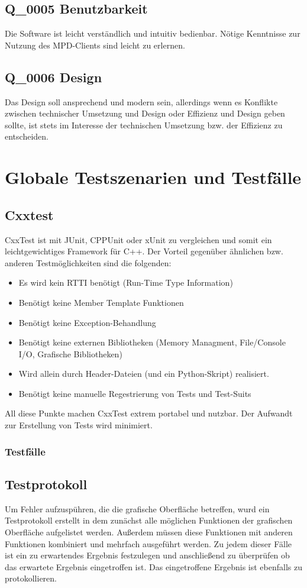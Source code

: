 \subsection{Q\_0005 Benutzbarkeit}
Die Software ist leicht verständlich und intuitiv bedienbar. Nötige Kenntnisse zur Nutzung des 
MPD-Clients sind leicht zu erlernen.
\subsection{Q\_0006 Design}
Das Design soll ansprechend und modern sein, allerdings wenn es Konflikte zwischen technischer Umsetzung 
und Design oder Effizienz und Design geben sollte, ist stets im Interesse der technischen Umsetzung bzw. 
der Effizienz zu entscheiden.
\section{Globale Testszenarien und Testfälle}
\subsection{Cxxtest}
CxxTest ist mit JUnit, CPPUnit oder xUnit zu vergleichen und somit ein leichtgewichtiges Framework für C++.
Der Vorteil gegenüber ähnlichen bzw. anderen Testmöglichkeiten sind die folgenden:
\begin{itemize}
	\item Es wird kein RTTI benötigt (Run-Time Type Information)
	\item Benötigt keine Member Template Funktionen
	\item Benötigt keine Exception-Behandlung
	\item Benötigt keine externen Bibliotheken (Memory Managment, File/Console I/O, Grafische Bibliotheken)
	\item Wird allein durch Header-Dateien (und ein Python-Skript) realisiert.
	\item Benötigt keine manuelle Regestrierung von Tests und Test-Suits
\end{itemize}
All diese Punkte machen CxxTest extrem portabel und nutzbar. Der Aufwandt zur Erstellung von Tests
wird minimiert.
\subsubsection{Testfälle}
\subsection{Testprotokoll}
Um Fehler aufzuspühren, die die grafische Oberfläche betreffen, wurd ein Testprotokoll erstellt in dem zunächst
alle möglichen Funktionen der grafischen Oberfläche aufgelistet werden. Außerdem müssen diese Funktionen mit 
anderen Funktionen kombiniert und mehrfach ausgeführt werden. Zu jedem dieser Fälle ist ein zu erwartendes Ergebnis
festzulegen und anschließend zu überprüfen ob das erwartete Ergebnis eingetroffen ist. Das eingetroffene Ergebnis
ist ebenfalls zu protokollieren.
